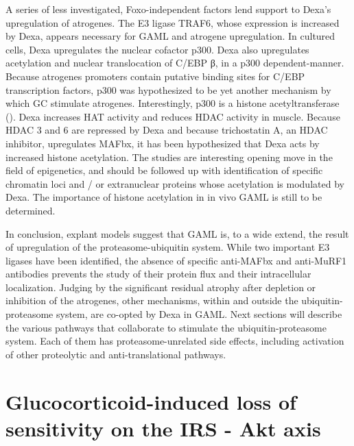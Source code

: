 \documentclass[12pt,english]{report}\usepackage[]{graphicx}\usepackage[]{color}
\begin{document}
A series of less investigated, Foxo-independent factors lend support
to Dexa's upregulation of atrogenes. The E3 ligase TRAF6, whose expression
is increased by Dexa, appears necessary for GAML and atrogene upregulation\citep{sun2014traf6}.
In cultured cells, Dexa upregulates the nuclear cofactor p300\citep{yang2005dexamethasone}.
Dexa also upregulates acetylation and nuclear translocation of C/EBP
β, in a p300 dependent-manner\citep{chamberlain2012multiple}. Because
atrogenes promoters contain putative binding sites for C/EBP transcription
factors, p300 was hypothesized to be yet another mechanism by which
GC stimulate atrogenes. Interestingly, p300 is a histone acetyltransferase
(). Dexa increases HAT
activity and reduces HDAC activity in muscle\citep{alamdari2010sepsis}.
Because HDAC 3 and 6 are repressed by Dexa and because trichostatin
A, an HDAC inhibitor, upregulates MAFbx, it has been hypothesized
that Dexa acts by increased histone acetylation. The studies are interesting
opening move in the field of epigenetics, and should be followed up
with identification of specific chromatin loci and / or extranuclear
proteins whose acetylation is modulated by Dexa. The importance of
histone acetylation in in vivo GAML is still to be determined.

In conclusion, explant models suggest that GAML is, to a wide extend,
the result of upregulation of the proteasome-ubiquitin system. While
two important E3 ligases have been identified, the absence of specific
anti-MAFbx and anti-MuRF1 antibodies prevents the study of their protein
flux and their intracellular localization\citep{bodine2014skeletal}.
Judging by the significant residual atrophy after depletion or inhibition
of the atrogenes, other mechanisms, within and outside the ubiquitin-proteasome
system, are co-opted by Dexa in GAML. Next sections will describe
the various pathways that collaborate to stimulate the ubiquitin-proteasome
system. Each of them has proteasome-unrelated side effects, including
activation of other proteolytic and anti-translational pathways.


\section{Glucocorticoid-induced loss of sensitivity on the IRS - Akt axis}
\end{document}
